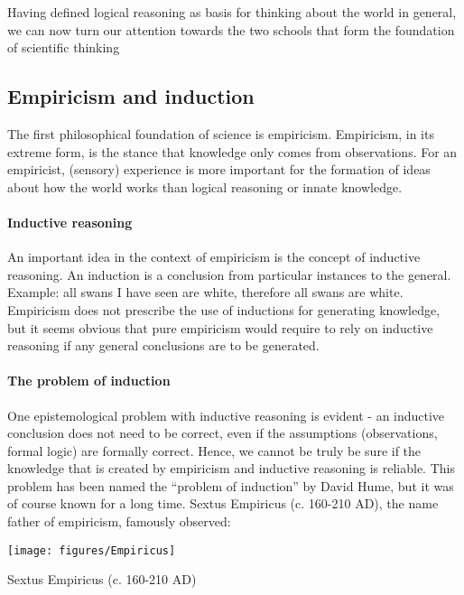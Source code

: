 \documentclass{tufte-book}
\begin{document}
Having defined logical reasoning as basis for thinking about the world in general, we can now turn our attention towards the two schools that form the foundation of scientific thinking


\subsection{Empiricism and induction}

The first philosophical foundation of science is empiricism. Empiricism, in its extreme form, is the stance that knowledge only comes from observations. For an empiricist, (sensory) experience is more important for the formation of ideas about how the world works than logical reasoning or innate knowledge. 

\paragraph{Inductive reasoning} An important idea in the context of empiricism is the concept of inductive reasoning. An induction is a conclusion from particular instances to the general. Example: all swans I have seen are white, therefore all swans are white. Empiricism does not prescribe the use of inductions for generating knowledge, but it seems obvious that pure empiricism would require to rely on inductive reasoning if any general conclusions are to be generated. 


\paragraph{The problem of induction}One epistemological problem with inductive reasoning is evident - an inductive conclusion does not need to be correct, even if the assumptions (observations, formal logic) are formally correct. Hence, we cannot be truly be sure if the knowledge that is created by empiricism and inductive reasoning is reliable. This problem has been named the ``problem of induction'' by David Hume, but it was of course known for a long time. Sextus Empiricus (c. 160-210 AD), the name father of empiricism, famously observed:

\begin{marginfigure}
\begin{center}
\texttt{[image: figures/Empiricus]}
\caption{Sextus Empiricus (c. 160-210 AD)}
\label{fig: Empiricus}
\end{center}
\end{marginfigure}
\end{document}
